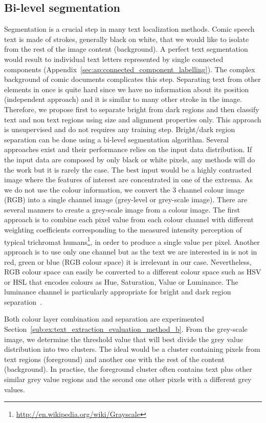 \subsection{Bi-level segmentation}
\label{sec:in:segmentation}
Segmentation is a crucial step in many text localization methods.
Comic speech text is made of strokes, generally black on white, that we would like to isolate from the rest of the image content (background).
A perfect text segmentation would result to individual text letters represented by single connected components (Appendix~\ref{sec:ap:connected_component_labelling}).
The complex background of comic documents complicates this step.
Separating text from other elements in once is quite hard since we have no information about its position (independent approach) and it is similar to many other stroke in the image.
Therefore, we propose first to separate bright from dark regions and then classify text and non text regions using size and alignment properties only.
This approach is unsupervised and do not requires any training step.
Bright/dark region separation can be done using a bi-level segmentation algorithm.
Several approaches exist and their performance relies on the input data distribution.
If the input data are composed by only black or white pixels, any methods will do the work but it is rarely the case.
The best input would be a highly contrasted image where the features of interest are concentrated in one of the extrema.
As we do not use the colour information, we convert the 3 channel colour image (RGB) into a single channel image (grey-level or grey-scale image).
There are several manners to create a grey-scale image from a colour image.
The first approach is to combine each pixel value from each colour channel with different weighting coefficients corresponding to the measured intensity perception of typical trichromat humans\footnote{\url{http://en.wikipedia.org/wiki/Grayscale}}, in order to produce a single value per pixel.
Another approach is to use only one channel but as the text we are interested in is not in red, green or blue (RGB colour space) it is irrelevant in our case.
Nevertheless, RGB colour space can easily be converted to a different colour space such as HSV or HSL that encodes colours as Hue, Saturation, Value or Luminance.
The luminance channel is particularly appropriate for bright and dark region separation~\cite{Ho2012}.

Both colour layer combination and separation are experimented Section~\ref{sub:ex:text_extraction_evaluation_method_b}.
From the grey-scale image, we determine the threshold value that will best divide the grey value distribution into two clusters.
The ideal would be a cluster containing pixels from text regions (foreground) and another one with the rest of the content (background).
In practise, the foreground cluster often contains text plus other similar grey value regions and the second one other pixels with a different grey values.


